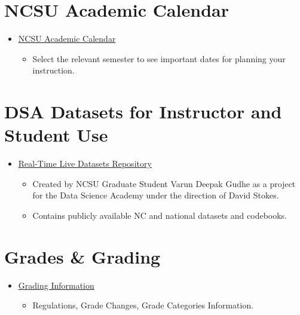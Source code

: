\documentclass[
]{book}
\providecommand{\tightlist}{%
  \setlength{\itemsep}{0pt}\setlength{\parskip}{0pt}}
\begin{document}
\hypertarget{ncsu-academic-calendar}{%
\section{NCSU Academic Calendar}\label{ncsu-academic-calendar}}

\begin{itemize}
\tightlist
\item
  \href{https://studentservices.ncsu.edu/calendars/academic/}{NCSU Academic Calendar}

  \begin{itemize}
  \tightlist
  \item
    Select the relevant semester to see important dates for planning your instruction.
  \end{itemize}
\end{itemize}

\hypertarget{dsa-datasets-for-instructor-and-student-use}{%
\section{DSA Datasets for Instructor and Student Use}\label{dsa-datasets-for-instructor-and-student-use}}

\begin{itemize}
\tightlist
\item
  \href{https://github.com/varundeepakgudhe/Data_Science_Academy}{Real-Time Live Datasets Repository}

  \begin{itemize}
  \tightlist
  \item
    Created by NCSU Graduate Student Varun Deepak Gudhe as a project for the Data Science Academy under the direction of David Stokes.
  \item
    Contains publicly available NC and national datasets and codebooks.
  \end{itemize}
\end{itemize}

\hypertarget{grades-grading}{%
\section{Grades \& Grading}\label{grades-grading}}

\begin{itemize}
\tightlist
\item
  \href{https://registrar.ncsu.edu/facultygradinginfo/}{Grading Information}

  \begin{itemize}
  \tightlist
  \item
    Regulations, Grade Changes, Grade Categories Information.
  \end{itemize}
\end{itemize}
\end{document}
